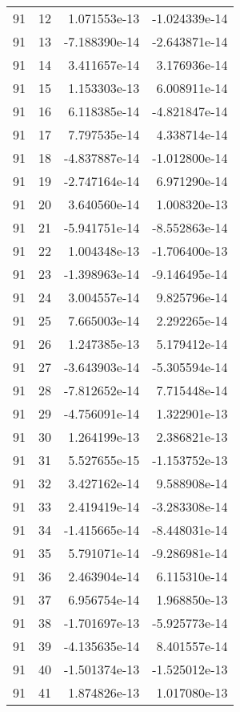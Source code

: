 \begin{tabular}{rrrr}
  91 &   12 &  1.071553e-13 & -1.024339e-14 \\
  91 &   13 & -7.188390e-14 & -2.643871e-14 \\
  91 &   14 &  3.411657e-14 &  3.176936e-14 \\
  91 &   15 &  1.153303e-13 &  6.008911e-14 \\
  91 &   16 &  6.118385e-14 & -4.821847e-14 \\
  91 &   17 &  7.797535e-14 &  4.338714e-14 \\
  91 &   18 & -4.837887e-14 & -1.012800e-14 \\
  91 &   19 & -2.747164e-14 &  6.971290e-14 \\
  91 &   20 &  3.640560e-14 &  1.008320e-13 \\
  91 &   21 & -5.941751e-14 & -8.552863e-14 \\
  91 &   22 &  1.004348e-13 & -1.706400e-13 \\
  91 &   23 & -1.398963e-14 & -9.146495e-14 \\
  91 &   24 &  3.004557e-14 &  9.825796e-14 \\
  91 &   25 &  7.665003e-14 &  2.292265e-14 \\
  91 &   26 &  1.247385e-13 &  5.179412e-14 \\
  91 &   27 & -3.643903e-14 & -5.305594e-14 \\
  91 &   28 & -7.812652e-14 &  7.715448e-14 \\
  91 &   29 & -4.756091e-14 &  1.322901e-13 \\
  91 &   30 &  1.264199e-13 &  2.386821e-13 \\
  91 &   31 &  5.527655e-15 & -1.153752e-13 \\
  91 &   32 &  3.427162e-14 &  9.588908e-14 \\
  91 &   33 &  2.419419e-14 & -3.283308e-14 \\
  91 &   34 & -1.415665e-14 & -8.448031e-14 \\
  91 &   35 &  5.791071e-14 & -9.286981e-14 \\
  91 &   36 &  2.463904e-14 &  6.115310e-14 \\
  91 &   37 &  6.956754e-14 &  1.968850e-13 \\
  91 &   38 & -1.701697e-13 & -5.925773e-14 \\
  91 &   39 & -4.135635e-14 &  8.401557e-14 \\
  91 &   40 & -1.501374e-13 & -1.525012e-13 \\
  91 &   41 &  1.874826e-13 &  1.017080e-13 \\

\end{tabular}
